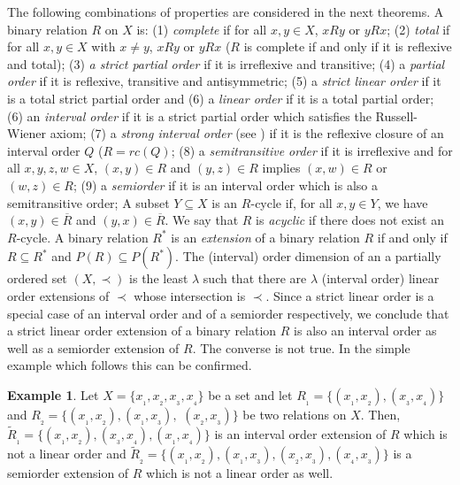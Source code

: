 \documentclass{article}
\theoremstyle{definition}
\newtheorem{example}[theorem]{Example}
\begin{document}
 


The following combinations of properties are considered in the next
theorems. A binary relation $R$ on $X$ is: 
(1) {\it complete} if for all $x, y\in X$, $xRy$ or $yRx$; 
(2) {\it total} if for all $x, y\in X$ with $x\neq y$, $xRy$ or $yRx$ 
($R$ is complete if and only if it is reflexive and total);
(3) {\it a strict partial order} if
it is irreflexive and transitive; (4) a {\it partial order} if
it is reflexive, transitive and antisymmetric;
(5)  a {\it strict linear order} if
it is a total strict partial order and (6) a {\it  linear order} if
it is a total partial order;
(6) an {\it interval order} if it is a strict partial order which satisfies the
Russell-Wiener axiom; (7)  a {\it strong interval order} (see \cite[Definition 3]{JPP}) if it is 
the reflexive closure of an interval order $Q$ ($R=rc(Q)$;
(8) a {\it semitransitive order} if it is irreflexive and for all $x, y, z, w\in X$, 
$(x,y)\in R$ and $(y,z)\in R$ implies $(x,w)\in R$ or $(w,z)\in R$; 
(9) a {\it semiorder} if it is an interval order which is also a semitransitive order;
A subset $Y\subseteq X$ is an $R$-cycle if, for all $x, y\in Y$, we have $(x, y) \in \overline{R}$ and 
$(y,x) \in \overline{R}$.
We say that $R$ is {\it acyclic} if there does not exist an $R$-cycle.
A binary relation $R^{\ast}$
is an {\it extension} of a binary relation $R$ if and only if
$R\subseteq R^{\ast}$ and $P(R)\subseteq P(R^{\ast})$. 
The (interval) order dimension of an a partially ordered set $(X,\prec)$ is the least $\lambda$ such that there are $\lambda$ (interval order) linear order extensions of $\prec$ whose intersection is $\prec$.
Since 
a strict linear order is a special case of an
interval order and of a semiorder respectively,
we conclude that 
a strict linear order
extension of a binary relation $R$
is also an
interval order as well as a semiorder extension of $R$.
The converse is not true.
In the simple example which follows this can be confirmed.
\begin{example}{\rm Let $X=\{x_{_1}, x_{_2}, x_{_3}, x_{_4}\}$ be a set
and let $R_{_1}=\{(x_{_1}, x_{_2}), (x_{_3}, x_{_4})\}$ and 
$R_{_2}=\{(x_{_1}, x_{_2}), (x_{_1}, x_{_3}),$
$(x_{_2}, x_{_3})\}$
be two relations on $X$.
Then, $\widetilde{R}_{_1}=\{(x_{_1}, x_{_2}), (x_{_3}, x_{_4}),(x_{_1}, x_{_4})\}$
is an interval order extension of $R$ which is not a linear order
and 
$\widetilde{R}_{_2}=\{(x_{_1}, x_{_2}), (x_{_1}, x_{_3}),(x_{_2}, x_{_3}),(x_{_4}, x_{_3})\}$
is a semiorder extension of $R$ which is not a linear order as well.}
\end{example}
\end{document}
